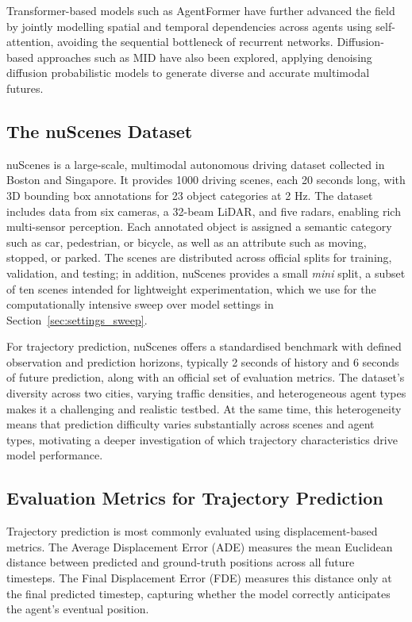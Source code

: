 \documentclass[12pt]{article}
\begin{document}
Transformer-based models such as AgentFormer \citep{yuan2021agentformer} have further advanced the field by jointly modelling spatial and temporal dependencies across agents using self-attention, avoiding the sequential bottleneck of recurrent networks. Diffusion-based approaches such as MID \citep{gu2022mid} have also been explored, applying denoising diffusion probabilistic models to generate diverse and accurate multimodal futures.
 
\subsection{The nuScenes Dataset}
\label{sec:dataset}
 
nuScenes \citep{caesar2020nuscenes} is a large-scale, multimodal autonomous driving dataset collected in Boston and Singapore. It provides 1000 driving scenes, each 20 seconds long, with 3D bounding box annotations for 23 object categories at 2 Hz. The dataset includes data from six cameras, a 32-beam LiDAR, and five radars, enabling rich multi-sensor perception. Each annotated object is assigned a semantic category such as car, pedestrian, or bicycle, as well as an attribute such as moving, stopped, or parked. The scenes are distributed across official splits for training, validation, and testing; in addition, nuScenes provides a small \emph{mini} split, a subset of ten scenes intended for lightweight experimentation, which we use for the computationally intensive sweep over model settings in Section~\ref{sec:settings_sweep}.
 
For trajectory prediction, nuScenes offers a standardised benchmark with defined observation and prediction horizons, typically 2 seconds of history and 6 seconds of future prediction, along with an official set of evaluation metrics. The dataset's diversity across two cities, varying traffic densities, and heterogeneous agent types makes it a challenging and realistic testbed. At the same time, this heterogeneity means that prediction difficulty varies substantially across scenes and agent types, motivating a deeper investigation of which trajectory characteristics drive model performance.
 
\subsection{Evaluation Metrics for Trajectory Prediction}
 
Trajectory prediction is most commonly evaluated using displacement-based metrics. The Average Displacement Error (ADE) measures the mean Euclidean distance between predicted and ground-truth positions across all future timesteps. The Final Displacement Error (FDE) measures this distance only at the final predicted timestep, capturing whether the model correctly anticipates the agent's eventual position.
 
\end{document}

